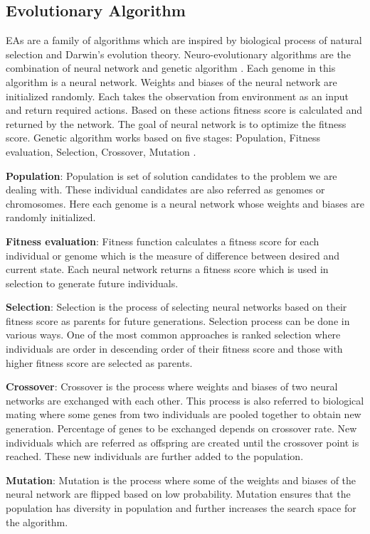 \documentclass{svproc}
\begin{document}
\subsection{Evolutionary Algorithm}
EAs are a family of algorithms which are inspired by biological process of natural selection and Darwin’s evolution theory. Neuro-evolutionary algorithms are the combination of neural network and genetic algorithm \cite{arulkumaran2017deep}. Each genome in this algorithm is a neural network. Weights and biases of the neural network are initialized randomly. Each takes the observation from environment as an input and return required actions. Based on these actions fitness score is calculated and returned by the network. The goal of neural network is to optimize the fitness score. Genetic algorithm works based on five stages: Population, Fitness evaluation, Selection, Crossover, Mutation \cite{russell2016artificial}\cite{haarnoja2018soft}.  

\textbf{Population}: Population is set of solution candidates to the problem we are dealing with. These individual candidates are also referred as genomes or chromosomes. Here each genome is a neural network whose weights and biases are randomly initialized. 

\textbf{Fitness evaluation}: Fitness function calculates a fitness score for each individual or genome which is the measure of difference between desired and current state. Each neural network returns a fitness score which is used in selection to generate future individuals.

\textbf{Selection}: Selection is the process of selecting neural networks based on their fitness score as parents for future generations. Selection process can be done in various ways. One of the most common approaches is ranked selection where individuals are order in descending order of their fitness score and those with higher fitness score are selected as parents.

\textbf{Crossover}: Crossover is the process where weights and biases of two neural networks are exchanged with each other. This process is also referred to biological mating where some genes from two individuals are pooled together to obtain new generation. Percentage of genes to be exchanged depends on crossover rate. New individuals which are referred as offspring are created until the crossover point is reached. These new individuals are further added to the population.

\textbf{Mutation}: Mutation is the process where some of the weights and biases of the neural network are flipped based on low probability. Mutation ensures that the population has diversity in population and further increases the search space for the algorithm.
\end{document}
